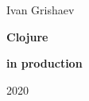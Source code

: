 \begin{titlepage}

\begin{center}

  {Ivan Grishaev}

  \vspace*{5cm}

  {\Huge\textbf{Clojure}}

  \vspace{1mm}

  {\Large\textbf{in production}}

  \vspace*{\fill}



  {2020}

\end{center}

\end{titlepage}
